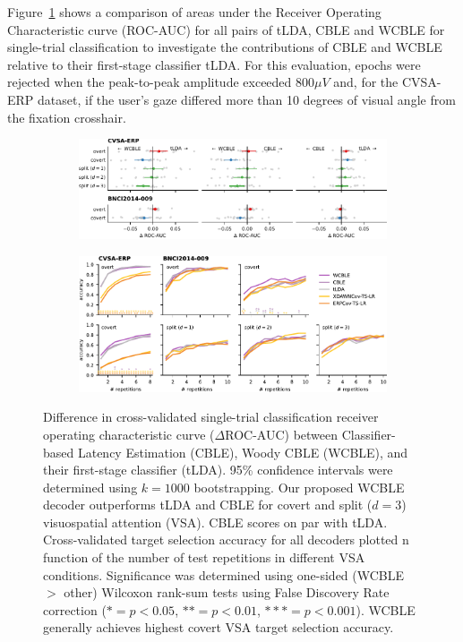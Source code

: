 Figure~\ref{fig:single_trial_roc_auc_diff} shows a comparison of areas under the
Receiver Operating Characteristic curve (ROC-AUC) for all pairs of tLDA, CBLE
and WCBLE for single-trial classification to investigate the contributions of
CBLE and WCBLE relative to their first-stage classifier tLDA.
For this evaluation, epochs were rejected when the peak-to-peak amplitude
exceeded 800$\mu V$ and, for the CVSA-ERP dataset, if the user's gaze differed more than
10 degrees of visual angle from the fixation crosshair.
\begin{figure}
  \bigskip
	\begin{subfigure}{\linewidth}
		\caption{}
		\label{fig:single_trial_roc_auc_diff}
		\includegraphics[width=\linewidth]{figures/covert_align/figure4a.pdf}
	\end{subfigure}

	\bigskip

	\begin{subfigure}{\linewidth}
		\caption{}
		\label{fig:block_evaluation}
		\includegraphics[width=\linewidth]{figures/covert_align/figure4b.pdf}
	\end{subfigure}
  \caption[Decoder performance.]{%
		 Difference in cross-validated
    single-trial classification receiver operating characteristic curve ($\Delta$ROC-AUC)
    between Classifier-based Latency Estimation (CBLE), Woody
    CBLE (WCBLE),	and their first-stage classifier (tLDA).
    95\% confidence intervals were determined using $k=1000$ bootstrapping.
    Our proposed WCBLE decoder outperforms tLDA and CBLE for covert and split
		($d=3$)	visuospatial attention (VSA). CBLE scores on par with tLDA.
		 Cross-validated target selection accuracy for
    all decoders plotted n function of the number of test repetitions in
    different VSA conditions. Significance was determined using one-sided
    (WCBLE $>$ other) Wilcoxon rank-sum tests using False Discovery Rate correction
    ($*= p<0.05$, $**=p<0.01$, $***=p<0.001$). WCBLE generally achieves highest
    covert VSA target selection accuracy.}
\end{figure}
